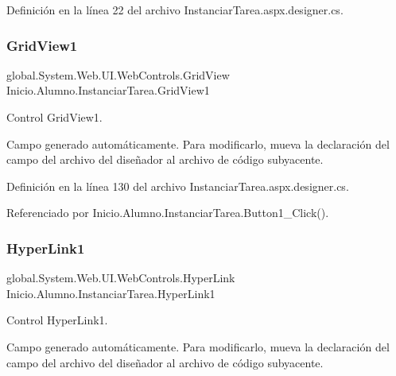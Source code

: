 Definición en la línea 22 del archivo Instanciar\+Tarea.\+aspx.\+designer.\+cs.

\mbox{\label{classInicio_1_1Alumno_1_1InstanciarTarea_a9cbdd81cbaa261dd71a3eb9709beb460}} 
\subsubsection{\texorpdfstring{GridView1}{GridView1}}
{\footnotesize\ttfamily global.\+System.\+Web.\+U\+I.\+Web\+Controls.\+Grid\+View Inicio.\+Alumno.\+Instanciar\+Tarea.\+Grid\+View1\hspace{0.3cm}{\ttfamily [protected]}}



Control Grid\+View1. 

Campo generado automáticamente. Para modificarlo, mueva la declaración del campo del archivo del diseñador al archivo de código subyacente. 

Definición en la línea 130 del archivo Instanciar\+Tarea.\+aspx.\+designer.\+cs.



Referenciado por Inicio.\+Alumno.\+Instanciar\+Tarea.\+Button1\+\_\+\+Click().

\mbox{\label{classInicio_1_1Alumno_1_1InstanciarTarea_a94f3a60064049cdaa85c24a497788549}} 
\subsubsection{\texorpdfstring{HyperLink1}{HyperLink1}}
{\footnotesize\ttfamily global.\+System.\+Web.\+U\+I.\+Web\+Controls.\+Hyper\+Link Inicio.\+Alumno.\+Instanciar\+Tarea.\+Hyper\+Link1\hspace{0.3cm}{\ttfamily [protected]}}



Control Hyper\+Link1. 

Campo generado automáticamente. Para modificarlo, mueva la declaración del campo del archivo del diseñador al archivo de código subyacente. 

